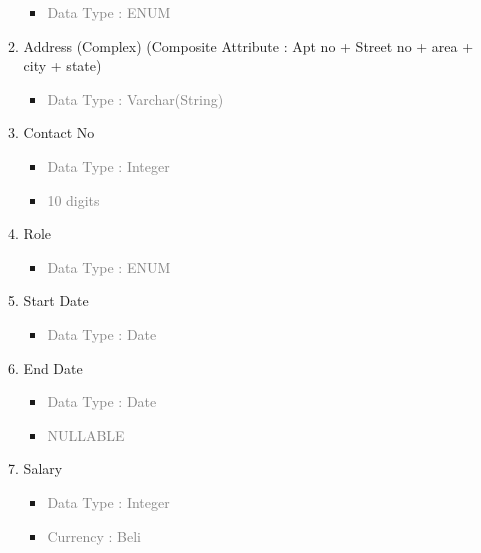 \begin{enumerate}
\begin{enumerate}[label=\alph*.]
\begin{itemize}[label=-]
                        \item \textcolor{gray}{Data Type : ENUM}
                    \end{itemize}
                \item Address (Complex) (Composite Attribute : Apt no + Street no + area + city + state)
                    \begin{itemize}[label=-]
                        \item \textcolor{gray}{Data Type : Varchar(String)}
                    \end{itemize}
                \item Contact No
                    \begin{itemize}[label=-]
                        \item \textcolor{gray}{Data Type : Integer}
                        \item \textcolor{gray}{10 digits}
                    \end{itemize}
                \item Role
                    \begin{itemize}[label=-]
                        \item \textcolor{gray}{Data Type : ENUM}
                    \end{itemize}
                \item Start Date
                    \begin{itemize}[label=-]
                        \item \textcolor{gray}{Data Type : Date}
                    \end{itemize}
                \item End Date
                    \begin{itemize}[label=-]
                        \item \textcolor{gray}{Data Type : Date}
                        \item \textcolor{gray}{NULLABLE}
                    \end{itemize}
                \item Salary
                    \begin{itemize}[label=-]
                        \item \textcolor{gray}{Data Type : Integer}
                        \item \textcolor{gray}{Currency : Beli}
                    \end{itemize}
            \end{enumerate}
        

\end{enumerate}
